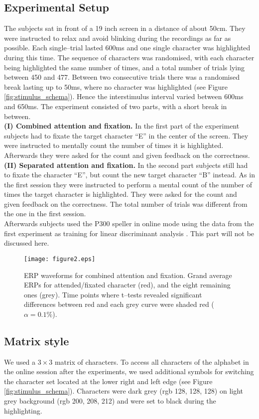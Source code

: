 \documentclass[a4paper,twocolumn]{article}
\begin{document}
\subsection*{Experimental Setup}
The subjects sat in front of a 19 inch screen in a distance of about 50cm. They were instructed to relax and avoid blinking during the recordings as far as possible. Each single--trial lasted 600ms and one single character was highlighted during this time. The sequence of characters was randomised, with each character being highlighted the same number of times, and a total number of trials lying between 450 and 477. Between two consecutive trials there was a randomised break lasting up to 50ms, where no character was highlighted (see Figure \ref{fig:stimulus_schema}). Hence the interstimulus interval varied between 600ms and 650ms. The experiment consisted of two parts, with a short break in between. \\ 
\textbf{(I) Combined attention and fixation.} In the first part of the experiment subjects had to fixate the target character ``E'' in the center of the screen. They were instructed to mentally count the number of times it is highlighted. Afterwards they were asked for the count and given feedback on the correctness.\\
 \textbf{(II) Separated attention and fixation.} In the second part subjects still had to fixate the character ``E'', but count the new target character ``B'' instead. As in the first session they were instructed to perform a mental count of the number of times the target character is highlighted. They were asked for the count and given feedback on the correctness. The total number of trials was different from the one in the first session.\\ 
Afterwards subjects used the P300 speller in online mode using the data from the first experiment as training for linear discriminant analysis \cite{Bandt2009}. This part will not be discussed here.
\begin{figure*}[t!!]
\begin{center}
\texttt{[image: figure2.eps]}
\end{center}
\caption{{ERP waveforms for combined attention and fixation.} Grand average ERPs for attended/fixated character (red), and the eight remaining ones (grey). Time points where t--tests revealed significant differences between red and each grey curve were shaded red ($\alpha=0.1\%$).}
\label{fig:grandaverage_part1}
\end{figure*} 
\subsection*{Matrix style}
We used a $3\times3$ matrix of characters. To access all characters of the alphabet in the online session after the experiments, we used additional symbols for switching the character set located at the lower right and left edge (see Figure \ref{fig:stimulus_schema}).
Characters were dark grey (rgb 128, 128, 128) on light grey background (rgb 200, 208, 212) and were set to black during the highlighting.
\end{document}
